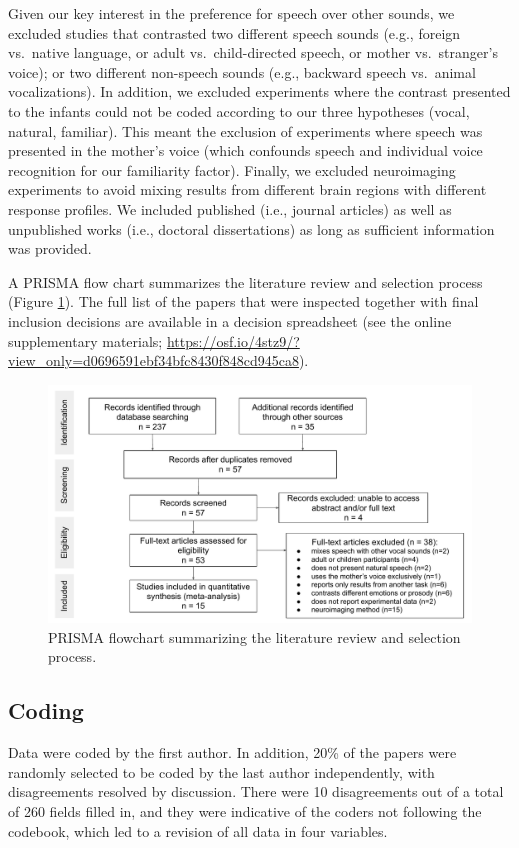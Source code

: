 \documentclass[
  man,mask,floatsintext]{apa6}
\begin{document}
Given our key interest in the preference for speech over other sounds, we excluded studies that contrasted two different speech sounds (e.g., foreign vs.~native language, or adult vs.~child-directed speech, or mother vs.~stranger's voice); or two different non-speech sounds (e.g., backward speech vs.~animal vocalizations). In addition, we excluded experiments where the contrast presented to the infants could not be coded according to our three hypotheses (vocal, natural, familiar). This meant the exclusion of experiments where speech was presented in the mother's voice (which confounds speech and individual voice recognition for our familiarity factor). Finally, we excluded neuroimaging experiments to avoid mixing results from different brain regions with different response profiles. We included published (i.e., journal articles) as well as unpublished works (i.e., doctoral dissertations) as long as sufficient information was provided.

A PRISMA flow chart summarizes the literature review and selection process (Figure \ref{fig:prisma}). The full list of the papers that were inspected together with final inclusion decisions are available in a decision spreadsheet (see the online supplementary materials; \url{https://osf.io/4stz9/?view_only=d0696591ebf34bfc8430f848cd945ca8}).

\begin{figure}
\includegraphics[width=0.75\linewidth]{figures_intro/PRISMA} \caption{PRISMA flowchart summarizing the literature review and selection process.}\label{fig:prisma}
\end{figure}

\hypertarget{coding}{%
\subsection{Coding}\label{coding}}

Data were coded by the first author. In addition, 20\% of the papers were randomly selected to be coded by the last author independently, with disagreements resolved by discussion. There were 10 disagreements out of a total of 260 fields filled in, and they were indicative of the coders not following the codebook, which led to a revision of all data in four variables.
\end{document}
